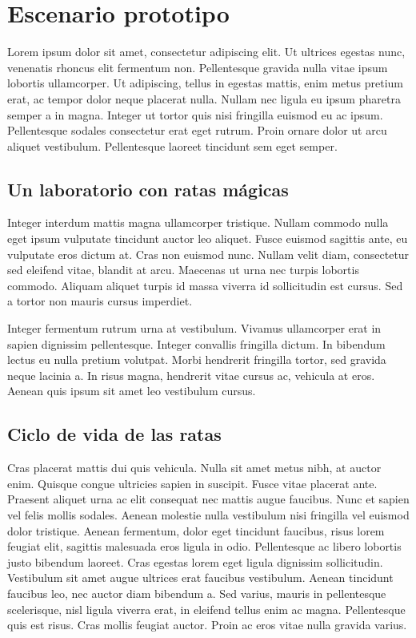 
\chapter{Escenario prototipo}


Lorem ipsum dolor sit amet, consectetur adipiscing elit. Ut ultrices egestas nunc, venenatis rhoncus elit fermentum non. Pellentesque gravida nulla vitae ipsum lobortis ullamcorper. Ut adipiscing, tellus in egestas mattis, enim metus pretium erat, ac tempor dolor neque placerat nulla. Nullam nec ligula eu ipsum pharetra semper a in magna. Integer ut tortor quis nisi fringilla euismod eu ac ipsum. Pellentesque sodales consectetur erat eget rutrum. Proin ornare dolor ut arcu aliquet vestibulum. Pellentesque laoreet tincidunt sem eget semper.

\section{Un laboratorio con ratas mágicas}

Integer interdum mattis magna ullamcorper tristique. Nullam commodo nulla eget ipsum vulputate tincidunt auctor leo aliquet. Fusce euismod sagittis ante, eu vulputate eros dictum at. Cras non euismod nunc. Nullam velit diam, consectetur sed eleifend vitae, blandit at arcu. Maecenas ut urna nec turpis lobortis commodo. Aliquam aliquet turpis id massa viverra id sollicitudin est cursus. Sed a tortor non mauris cursus imperdiet.

Integer fermentum rutrum urna at vestibulum. Vivamus ullamcorper erat in sapien dignissim pellentesque. Integer convallis fringilla dictum. In bibendum lectus eu nulla pretium volutpat. Morbi hendrerit fringilla tortor, sed gravida neque lacinia a. In risus magna, hendrerit vitae cursus ac, vehicula at eros. Aenean quis ipsum sit amet leo vestibulum cursus.

\section{Ciclo de vida de las ratas}

Cras placerat mattis dui quis vehicula. Nulla sit amet metus nibh, at auctor enim. Quisque congue ultricies sapien in suscipit. Fusce vitae placerat ante. Praesent aliquet urna ac elit consequat nec mattis augue faucibus. Nunc et sapien vel felis mollis sodales. Aenean molestie nulla vestibulum nisi fringilla vel euismod dolor tristique. Aenean fermentum, dolor eget tincidunt faucibus, risus lorem feugiat elit, sagittis malesuada eros ligula in odio. Pellentesque ac libero lobortis justo bibendum laoreet. Cras egestas lorem eget ligula dignissim sollicitudin. Vestibulum sit amet augue ultrices erat faucibus vestibulum. Aenean tincidunt faucibus leo, nec auctor diam bibendum a. Sed varius, mauris in pellentesque scelerisque, nisl ligula viverra erat, in eleifend tellus enim ac magna. Pellentesque quis est risus. Cras mollis feugiat auctor. Proin ac eros vitae nulla gravida varius.

